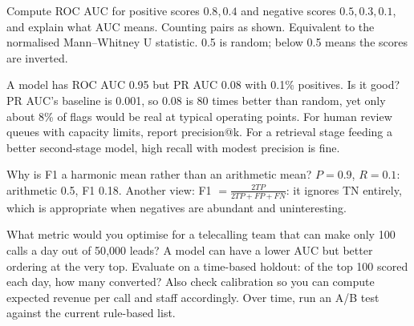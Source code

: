 \begin{qa}{Compute ROC AUC for positive scores $0.8, 0.4$ and negative scores $0.5, 0.3, 0.1$, and explain what AUC means.}
\why Counting pairs as shown. Equivalent to the normalised Mann--Whitney U statistic. 0.5 is random; below 0.5 means the scores are
inverted.
\end{qa}

\begin{qa}{\deep A model has ROC AUC 0.95 but PR AUC 0.08 with 0.1\% positives. Is it good?}
\why PR AUC's baseline is 0.001, so 0.08 is 80 times better than random, yet only about 8\% of flags would be real at typical
operating points. For human review queues with capacity limits, report precision@k. For a retrieval stage feeding a better
second-stage model, high recall with modest precision is fine.
\end{qa}

\begin{qa}{Why is F1 a harmonic mean rather than an arithmetic mean?}
\why $P = 0.9$, $R = 0.1$: arithmetic 0.5, F1 0.18. Another view: F1 $= \frac{2TP}{2TP + FP + FN}$: it ignores TN entirely, which is
appropriate when negatives are abundant and uninteresting.
\end{qa}

\begin{qa}{\deep What metric would you optimise for a telecalling team that can make only 100 calls a day out of 50{,}000 leads?}
\why A model can have a lower AUC but better ordering at the very top. Evaluate on a time-based holdout: of the top 100 scored each day,
how many converted? Also check calibration so you can compute expected revenue per call and staff accordingly. Over time, run an A/B
test against the current rule-based list.
\end{qa}

